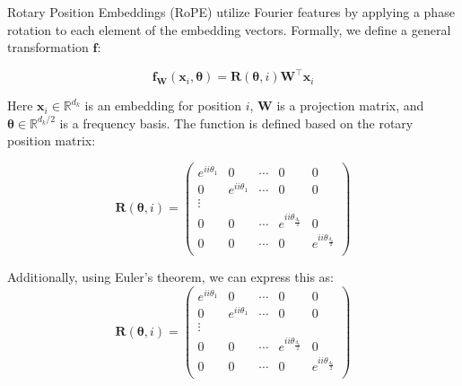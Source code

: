 \documentclass{article}
\begin{document}
Rotary Position Embeddings (RoPE) \citep{su2024roformer} utilize Fourier features by applying a phase rotation to each element of the embedding vectors. Formally, we define a general transformation $\mathbf{f}$:


\begin{equation}
\mathbf{f}_\mathbf{W}(\mathbf{x}_i, \bm{\theta}) = \mathbf{R}(\bm{\theta}, i)\mathbf{W}^\top \mathbf{x}_i
\end{equation}

Here $\mathbf{x}_i \in \mathbb{R}^{d_k}$ is an embedding for position $i$, $\mathbf{W}$ is a projection matrix, and $\bm{\theta} \in \mathbb{R}^{d_k / 2}$ is a frequency basis. The function is defined based on the rotary position matrix: 

\begin{equation}
\mathbf{R}(\bm{\theta},i)= \begin{pmatrix}
e^{i i\theta_1} & 0 &  \cdots & 0 & 0 \\
0 & e^{i i\theta_1} & \cdots & 0 & 0 \\
\vdots \\ 
0 & 0 &  \cdots & e^{i i\theta_\frac{d_k}{2}}  & 0 \\
0 & 0 &  \cdots & 0  & e^{i i\theta_\frac{d_k}{2}}  \\
\end{pmatrix}
\end{equation}

Additionally, using Euler's theorem, we can express this as:
\begin{equation}
\mathbf{R}(\bm{\theta},i)= \begin{pmatrix}
e^{i i\theta_1} & 0 &  \cdots & 0 & 0 \\
0 & e^{i i\theta_1} & \cdots & 0 & 0 \\
\vdots \\ 
0 & 0 &  \cdots & e^{i i\theta_\frac{d_k}{2}}  & 0 \\
0 & 0 &  \cdots & 0  & e^{i i\theta_\frac{d_k}{2}}  \\
\end{pmatrix}
\end{equation}





 
\end{document}
